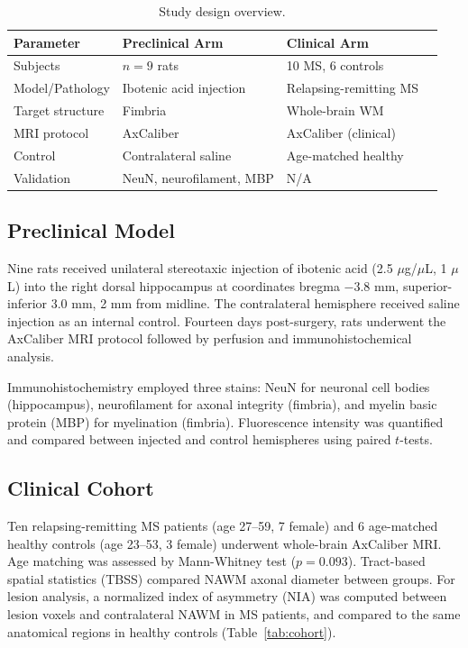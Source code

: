 \documentclass[11pt]{article}
\begin{document}
\begin{table}[htbp]
\centering
\caption{Study design overview.}
\label{tab:design}
\begin{tabular}{llll}
\toprule
Parameter & Preclinical Arm & Clinical Arm \\
\midrule
Subjects & $n = 9$ rats & 10 MS, 6 controls \\
Model/Pathology & Ibotenic acid injection & Relapsing-remitting MS \\
Target structure & Fimbria & Whole-brain WM \\
MRI protocol & AxCaliber & AxCaliber (clinical) \\
Control & Contralateral saline & Age-matched healthy \\
Validation & NeuN, neurofilament, MBP & N/A \\
\bottomrule
\end{tabular}
\end{table}

\subsection{Preclinical Model}

Nine rats received unilateral stereotaxic injection of ibotenic acid (2.5 $\mu$g/$\mu$L, 1 $\mu$L) into the right dorsal hippocampus at coordinates bregma $-3.8$ mm, superior-inferior 3.0 mm, 2 mm from midline. The contralateral hemisphere received saline injection as an internal control. Fourteen days post-surgery, rats underwent the AxCaliber MRI protocol followed by perfusion and immunohistochemical analysis.

Immunohistochemistry employed three stains: NeuN for neuronal cell bodies (hippocampus), neurofilament for axonal integrity (fimbria), and myelin basic protein (MBP) for myelination (fimbria). Fluorescence intensity was quantified and compared between injected and control hemispheres using paired $t$-tests.

\subsection{Clinical Cohort}

Ten relapsing-remitting MS patients (age 27--59, 7 female) and 6 age-matched healthy controls (age 23--53, 3 female) underwent whole-brain AxCaliber MRI. Age matching was assessed by Mann-Whitney test ($p = 0.093$). Tract-based spatial statistics (TBSS) compared NAWM axonal diameter between groups. For lesion analysis, a normalized index of asymmetry (NIA) was computed between lesion voxels and contralateral NAWM in MS patients, and compared to the same anatomical regions in healthy controls (Table~\ref{tab:cohort}).
\end{document}

